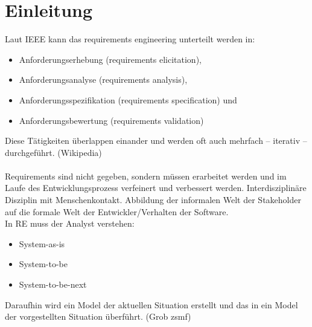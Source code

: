 \section{Einleitung}
Laut IEEE kann das requirements engineering unterteilt werden in:
\begin{itemize}
	\item Anforderungserhebung (requirements elicitation),
	\item Anforderungsanalyse (requirements analysis),
	\item Anforderungsspezifikation (requirements specification) und
	\item Anforderungsbewertung (requirements validation)
\end{itemize}
Diese Tätigkeiten überlappen einander und werden oft auch mehrfach – iterativ – durchgeführt. (Wikipedia)\\
\\
Requirements sind nicht gegeben, sondern müssen erarbeitet werden und im Laufe des Entwicklungsprozess verfeinert und verbessert werden.
Interdisziplinäre Disziplin mit Menschenkontakt. Abbildung der informalen Welt der Stakeholder auf die formale Welt der Entwickler/Verhalten der Software.\\
In RE muss der Analyst verstehen:
\begin{itemize}
	\item System-as-is
	\item System-to-be
	\item System-to-be-next
\end{itemize}
Daraufhin wird ein Model der aktuellen Situation erstellt und das in ein Model der vorgestellten Situation überführt. (Grob zsmf)
